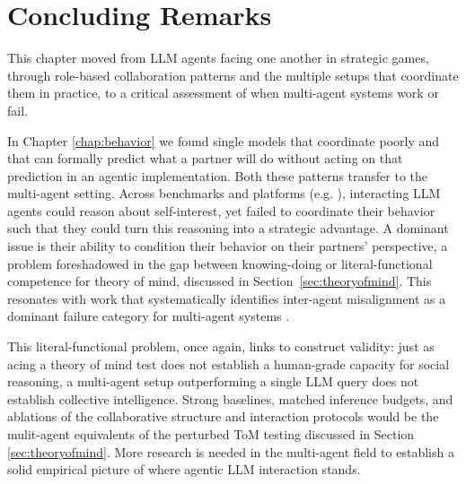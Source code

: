 
\section{Concluding Remarks}
This chapter moved from LLM agents facing one another in strategic games, through role-based collaboration patterns and the multiple setups that coordinate them in practice, to a critical assessment of when multi-agent systems work or fail. 

In Chapter \ref{chap:behavior} we found single models that coordinate poorly and that can formally predict what a partner will do without acting on that prediction in an agentic implementation. Both these patterns transfer to the multi-agent setting. Across benchmarks and platforms (e.g. \citep{xu2024magic, agashe2025llm}), interacting LLM agents could reason about self-interest, yet failed to coordinate their behavior such that they could turn this reasoning into a strategic advantage. A dominant issue is their ability to condition their behavior on their partners' perspective, a problem foreshadowed in the gap between knowing-doing or literal-functional competence for theory of mind, discussed in Section~\ref{sec:theoryofmind}. This resonates with work that systematically identifies inter-agent misalignment as a dominant failure category for multi-agent systems \citep{cemri2025masfail}.

This literal-functional problem, once again, links to construct validity: just as acing a theory of mind test does not establish a human-grade capacity for social reasoning, a multi-agent setup outperforming a single LLM query does not establish collective intelligence. Strong baselines, matched inference budgets, and ablations of the collaborative structure and interaction protocols would be the mulit-agent equivalents of the perturbed ToM testing discussed in Section \ref{sec:theoryofmind}. More research is needed in the multi-agent field to establish a solid empirical picture of where agentic LLM interaction stands.

